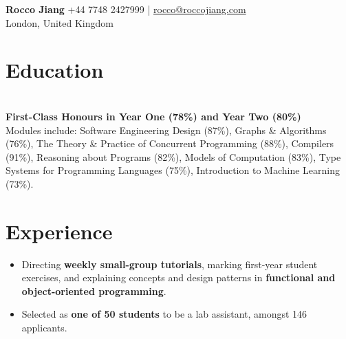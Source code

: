\documentclass[10pt]{article}
\begin{document}
\textbf{\Huge Rocco Jiang} \hfill +44 7748 2427999 | \href{mailto:rocco@roccojiang.com}{rocco@roccojiang.com} \\
London, United Kingdom \hfill {}  


\section{Education}
 \\
\textbf{First-Class Honours in Year One (78\%) and Year Two (80\%)} \\
Modules include:
Software Engineering Design (87\%),
Graphs \& Algorithms (76\%),
The Theory \& Practice of Concurrent Programming (88\%),
Compilers (91\%),
Reasoning about Programs (82\%),
Models of Computation (83\%),
Type Systems for Programming Languages (75\%),
Introduction to Machine Learning (73\%).

\section{Experience}

\begin{itemize}
  \item Directing \textbf{weekly small-group tutorials}, marking first-year student exercises, and explaining concepts and design patterns in \textbf{functional and object-oriented programming}.
  \item Selected as \textbf{one of 50 students} to be a lab assistant, amongst 146 applicants.
\end{itemize}
\entrysep
\end{document}
